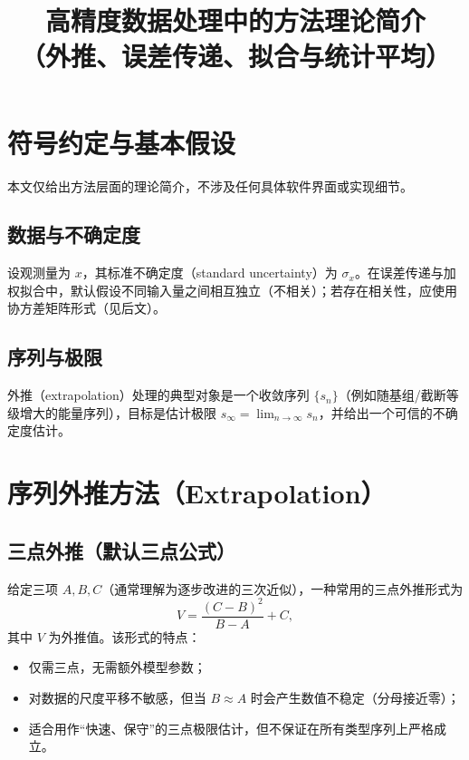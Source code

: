 \documentclass[UTF8,a4paper,11pt]{ctexart}
\title{高精度数据处理中的方法理论简介\\（外推、误差传递、拟合与统计平均）}
\author{}
\date{}
\begin{document}
\maketitle

\section{符号约定与基本假设}

本文仅给出方法层面的理论简介，不涉及任何具体软件界面或实现细节。

\subsection{数据与不确定度}

设观测量为 $x$，其标准不确定度（standard uncertainty）为 $\sigma_x$。在误差传递与加权拟合中，默认假设不同输入量之间相互独立（不相关）；若存在相关性，应使用协方差矩阵形式（见后文）。

\subsection{序列与极限}

外推（extrapolation）处理的典型对象是一个收敛序列 $\{s_n\}$（例如随基组/截断等级增大的能量序列），目标是估计极限 $s_\infty=\lim_{n\to\infty}s_n$，并给出一个可信的不确定度估计。

\section{序列外推方法（Extrapolation）}

\subsection{三点外推（默认三点公式）}

给定三项 $A,B,C$（通常理解为逐步改进的三次近似），一种常用的三点外推形式为
\begin{equation}
V = \frac{(C-B)^2}{B-A} + C,
\end{equation}
其中 $V$ 为外推值。该形式的特点：
\begin{itemize}
  \item 仅需三点，无需额外模型参数；
  \item 对数据的尺度平移不敏感，但当 $B\approx A$ 时会产生数值不稳定（分母接近零）；
  \item 适合用作“快速、保守”的三点极限估计，但不保证在所有类型序列上严格成立。
\end{itemize}
\end{document}
